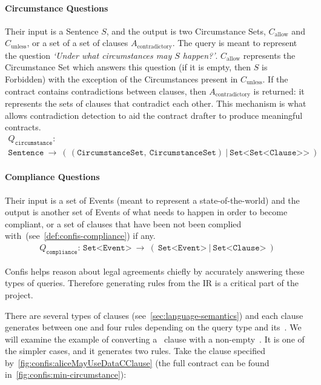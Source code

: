 \paragraph{Circumstance Questions} Their input is a Sentence $S$, and the output is two Circumstance Sets, $C_{\text{allow}}$ and $C_{\text{unless}}$, or a set of a set of clauses $A_{\text{contradictory}}$.
The query is meant to represent the question \emph{`Under what circumstances may $S$ happen?'}.
$C_{\text{allow}}$ represents the Circumstance Set which answers this question (if it is empty, then $S$ is Forbidden) with the exception of the Circumstances present in $C_{\text{unless}}$.
If the contract contains contradictions between clauses, then $A_{\text{contradictory}}$ is returned: it represents the sets of clauses that contradict each other.
This mechanism is what allows contradiction detection to aid the contract drafter to produce meaningful contracts.
\begin{gather}
    \nonumber Q_\texttt{circumstance}:\\
    \nonumber \texttt{Sentence}\ \to \ (\,(\texttt{CircumstanceSet}, \  \texttt{CircumstanceSet}) \ | \ \texttt{Set<Set<Clause>}\texttt{>} \ )
\end{gather}

\paragraph{Compliance Questions} Their input is a set of Events (meant to represent a state-of-the-world) and the output is another set of Events of what needs to happen in order to become compliant, or a set of clauses that have been not been complied with~(see~\autoref{def:confis-compliance}) if any.
\begin{gather}
    \nonumber
    Q_\texttt{compliance}: \, \texttt{Set<Event>}\ \to\ (\ \texttt{Set<Event>}\ | \ \texttt{Set<Clause>} \ )
\end{gather}


Confis helps reason about legal agreements chiefly by accurately answering these types of queries.
Therefore generating rules from the IR is a critical part of the project.

There are several types of clauses (see~\autoref{sec:language-semantics}) and each clause generates between one and four rules depending on the query type and its~.
We will examine the example of converting a~ clause with a non-empty~.
It is one of the simpler cases, and it generates two rules.
Take the clause specified by~\autoref{fig:confis:aliceMayUseDataCClause} (the full contract can be found in~\autoref{fig:confis:min-circumstance}):


